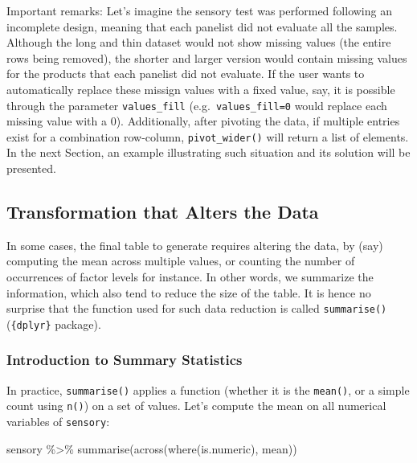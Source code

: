 \documentclass[
]{book}
\newenvironment{Shaded}{\begin{snugshade}}{\end{snugshade}}
\newcommand{\FunctionTok}[1]{\textcolor[rgb]{0.00,0.00,0.00}{#1}}
\newcommand{\NormalTok}[1]{#1}
\newcommand{\SpecialCharTok}[1]{\textcolor[rgb]{0.00,0.00,0.00}{#1}}
\begin{document}
Important remarks: Let's imagine the sensory test was performed following an incomplete design, meaning that each panelist did not evaluate all the samples. Although the long and thin dataset would not show missing values (the entire rows being removed), the shorter and larger version would contain missing values for the products that each panelist did not evaluate. If the user wants to automatically replace these missign values with a fixed value, say, it is possible through the parameter \texttt{values\_fill} (e.g.~\texttt{values\_fill=0} would replace each missing value with a 0). Additionally, after pivoting the data, if multiple entries exist for a combination row-column, \texttt{pivot\_wider()} will return a list of elements. In the next Section, an example illustrating such situation and its solution will be presented.

\hypertarget{transformation-that-alters-the-data}{%
\subsection{Transformation that Alters the Data}\label{transformation-that-alters-the-data}}

In some cases, the final table to generate requires altering the data, by (say) computing the mean across multiple values, or counting the number of occurrences of factor levels for instance. In other words, we summarize the information, which also tend to reduce the size of the table. It is hence no surprise that the function used for such data reduction is called \texttt{summarise()} (\texttt{\{dplyr\}} package).

\hypertarget{introduction-to-summary-statistics}{%
\subsubsection{Introduction to Summary Statistics}\label{introduction-to-summary-statistics}}

In practice, \texttt{summarise()} applies a function (whether it is the \texttt{mean()}, or a simple count using \texttt{n()}) on a set of values. Let's compute the mean on all numerical variables of \texttt{sensory}:

\begin{Shaded}
\begin{Highlighting}[]
\NormalTok{sensory }\SpecialCharTok{\%\textgreater{}\%} 
  \FunctionTok{summarise}\NormalTok{(}\FunctionTok{across}\NormalTok{(}\FunctionTok{where}\NormalTok{(is.numeric), mean))}
\end{Highlighting}
\end{Shaded}
\end{document}
